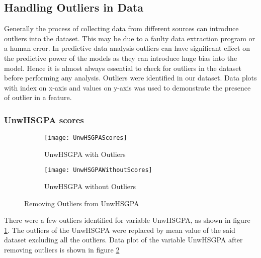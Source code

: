 \documentclass[11pt,openright]{report}
\begin{document}
\subsection {Handling Outliers in Data}

Generally the process of collecting data from different sources can introduce outliers into the dataset. This may be due to a faulty data extraction program or a human error. In predictive data analysis outliers can have significant effect on the predictive power of the models as they can introduce huge bias into the model. Hence it is almost always essential to check for outliers in the dataset before performing any analysis. Outliers were identified in our dataset. Data plots with index on x-axis and values on y-axis was used to demonstrate the presence of outlier in a feature.


\subsubsection{UnwHSGPA scores}

\begin{figure}
\centering
    \begin{subfigure}[b]{0.55\textwidth}            
            \texttt{[image: UnwHSGPAScores]}
            \caption{UnwHSGPA with Outliers}
            \label{fig:UnwHSGPA-with-outliers}
    \end{subfigure}%
    \begin{subfigure}[b]{0.55\textwidth}
            \centering
            \texttt{[image: UnwHSGPAWithoutScores]}
            \caption{UnwHSGPA without Outliers}
            \label{fig:UnwHSGPA-No-outliers}
    \end{subfigure}
    \caption{Removing Outliers from UnwHSGPA}\label{fig:unwHSGPA}
\end{figure}

 There were a few outliers identified for variable UnwHSGPA, as shown in figure \ref{fig:UnwHSGPA-with-outliers}. The outliers of the UnwHSGPA were replaced by mean value of the said dataset excluding all the outliers. Data plot of the variable UnwHSGPA after removing outliers is shown in figure \ref{fig:UnwHSGPA-No-outliers}
\end{document}
